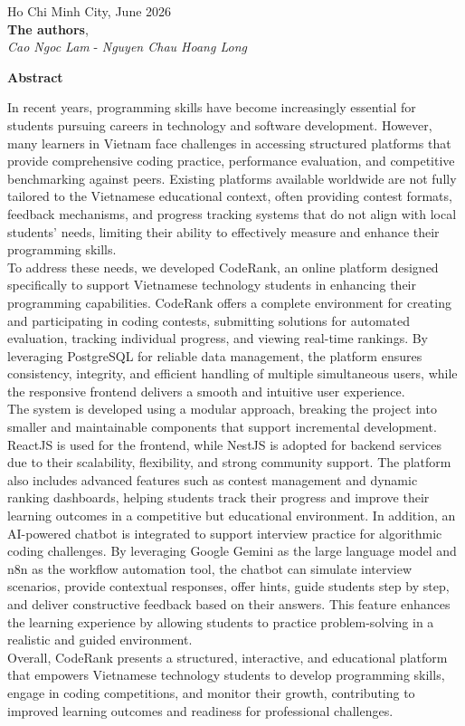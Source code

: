 \vspace{1cm}

\begin{flushright}
Ho Chi Minh City, June 2026\\
\textbf{The authors},\\
\textit{Cao Ngoc Lam} - \textit{Nguyen Chau Hoang Long}\\
\end{flushright}

\newpage

\noindent\textbf{\Huge Abstract}
\vspace{1cm}

In recent years, programming skills have become increasingly essential for students pursuing careers in technology and software development. However, many learners in Vietnam face challenges in accessing structured platforms that provide comprehensive coding practice, performance evaluation, and competitive benchmarking against peers. Existing platforms available worldwide are not fully tailored to the Vietnamese educational context, often providing contest formats, feedback mechanisms, and progress tracking systems that do not align with local students’ needs, limiting their ability to effectively measure and enhance their programming skills.\\

To address these needs, we developed CodeRank, an online platform designed specifically to support Vietnamese technology students in enhancing their programming capabilities. CodeRank offers a complete environment for creating and participating in coding contests, submitting solutions for automated evaluation, tracking individual progress, and viewing real-time rankings. By leveraging PostgreSQL for reliable data management, the platform ensures consistency, integrity, and efficient handling of multiple simultaneous users, while the responsive frontend delivers a smooth and intuitive user experience.\\

The system is developed using a modular approach, breaking the project into smaller and maintainable components that support incremental development. ReactJS is used for the frontend, while NestJS is adopted for backend services due to their scalability, flexibility, and strong community support. The platform also includes advanced features such as contest management and dynamic ranking dashboards, helping students track their progress and improve their learning outcomes in a competitive but educational environment. In addition, an AI-powered chatbot is integrated to support interview practice for algorithmic coding challenges. By leveraging Google Gemini as the large language model and n8n as the workflow automation tool, the chatbot can simulate interview scenarios, provide contextual responses, offer hints, guide students step by step, and deliver constructive feedback based on their answers. This feature enhances the learning experience by allowing students to practice problem-solving in a realistic and guided environment.\\

Overall, CodeRank presents a structured, interactive, and educational platform that empowers Vietnamese technology students to develop programming skills, engage in coding competitions, and monitor their growth, contributing to improved learning outcomes and readiness for professional challenges.
